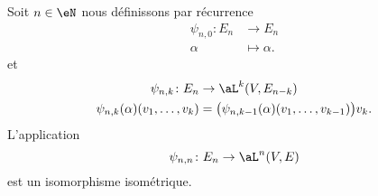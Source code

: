 \begin{lemma}
    Soit \( n\in \eN\) nous définissons par récurrence
    \begin{equation}
        \begin{aligned}
            \psi_{n,0}\colon E_n&\to E_n \\
            \alpha&\mapsto \alpha. 
        \end{aligned}
    \end{equation}
    et
    \begin{equation}
        \begin{aligned}
            \psi_{n,k}\colon E_n&\to \aL^k(V,E_{n-k}) \\
            \psi_{n,k}(\alpha)(v_1,\ldots, v_k)&=\big( \psi_{n,k-1}(\alpha)(v_1,\ldots, v_{k-1}) \big)v_k. 
        \end{aligned}
    \end{equation}
    L'application
    \begin{equation}
        \psi_{n,n}\colon E_n\to \aL^n(V,E) 
    \end{equation}
    est un isomorphisme isométrique.
\end{lemma}


